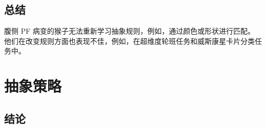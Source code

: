 \subsection{总结}
\par
腹侧 PF 病变的猴子无法重新学习抽象规则，例如，通过颜色或形状进行匹配。 他们在改变规则方面也表现不佳，例如，在超维度轮班任务和威斯康星卡片分类任务中。
\section{抽象策略}

\subsection{结论}


